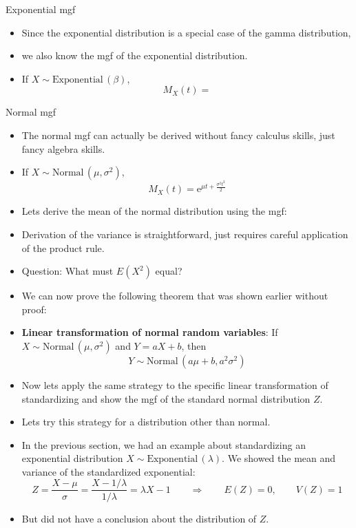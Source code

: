 \documentclass{article}
\newcommand{\follow}[1]{\sim \text{#1}\,}		%
\newcommand{\e}{\mathrm{e}}		%
\begin{document}
Exponential mgf\bigskip
\begin{itemize}
    \item Since the exponential distribution is a special case of the gamma distribution,
    \vspace{30pt}
    \item[] we also know the mgf of the exponential distribution.\bigskip
    \item If $X \follow{Exponential}(\beta)$,
    \[M_X(t) = \]
\end{itemize}\bigskip

Normal mgf\bigskip
\begin{itemize}
    \item The normal mgf can actually be derived without fancy calculus skills, just fancy algebra skills.
    \item If $X \follow{Normal}(\mu, \sigma^2)$,
    \[M_X(t) = \e^{\mu t + \frac{\sigma^2 t^2}{2}}\]
    \item Lets derive the mean of the normal distribution using the mgf:\vspace{50pt}
    \item Derivation of the variance is straightforward, just requires careful application of the product rule.
    \item[] Question: What must $E(X^2)$ equal?\vspace{30pt}
    \item We can now prove the following theorem that was shown earlier without proof:
    \item[] \textbf{Linear transformation of normal random variables}: If $X \sim \text{Normal}\,(\mu, \sigma^2)$ and $Y = aX + b$, then
    \[Y \sim \text{Normal}\,(a\mu + b, a^2\sigma^2)\]\vspace{100pt}
    \item Now lets apply the same strategy to the specific linear transformation of standardizing and show the mgf of the standard normal distribution $Z$.\vspace{100pt}
    \item Lets try this strategy for a distribution other than normal.
    \item[] In the previous section, we had an example about standardizing an exponential distribution $X \follow{Exponential}(\lambda)$. We showed the mean and variance of the standardized exponential:
    \[Z = \frac{X - \mu}{\sigma} = \frac{X - 1 / \lambda}{1 / \lambda} = \lambda X - 1 \quad\quad \Longrightarrow \quad\quad E(Z) = 0, \quad\quad V(Z) = 1\]
    \item[] But did not have a conclusion about the distribution of $Z$.\vspace{100pt}
\end{itemize}\bigskip
\end{document}
